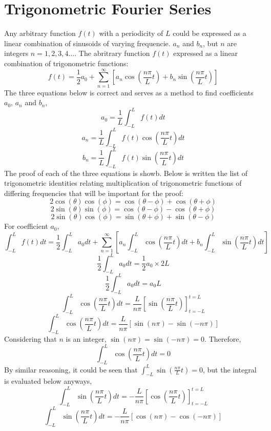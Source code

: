 \section{Trigonometric Fourier Series}
\begin{comment}
\end{comment}
Any arbitrary function $f(t)$ with a periodicity of $L$ could be expressed as a linear combination of sinusoids of varying frequencie. $a_n$ and $b_n$, but $n$ are integers $n = 1,2,3,4\dots$. The abritrary function $f(t)$ expressed as a linear combination of trigonometric functions:
$$f(t) = \frac{1}{2}a_0 + \sum_{n = 1}^{\infty}\left[a_n \cos\left(\frac{n\pi}{L}t\right) + b_n \sin\left(\frac{n\pi}{L}t\right)\right]$$
The three equations below is correct and serves as a method to find coefficients $a_0$, $a_n$ and $b_n$,
$$a_0 = \frac{1}{L}\int_{-L}^{L}f(t)dt$$
$$a_n = \frac{1}{L}\int_{-L}^{L}f(t)\cos\left(\frac{n\pi}{L}t\right)dt$$
$$b_n = \frac{1}{L}\int_{-L}^{L}f(t)\sin\left(\frac{n\pi}{L}t\right)dt$$
The proof of each of the three equations is showb. Below is written the list of trigonometric identities relating multiplication of trigonometric functions of differing frequencies that will be important for the proof:
$$2\cos(\theta)\cos(\phi) = \cos(\theta - \phi) + \cos(\theta + \phi)$$ 
$$2\sin(\theta)\sin(\phi) = \cos(\theta - \phi) - \cos(\theta + \phi)$$
$$2\sin(\theta)\cos(\phi) = \sin(\theta + \phi) + \sin(\theta - \phi)$$
For coefficient $a_0$,
$$\int_{-L}^{L}f(t)dt = \frac{1}{2} \int_{-L}^{L}a_0dt + \sum_{n = 1}^{\infty}\left[a_n \int_{-L}^{L}\cos\left(\frac{n\pi}{L}t\right)dt + b_n \int_{-L}^{L}\sin\left(\frac{n\pi}{L}t\right)dt\right]$$
$$\frac{1}{2} \int_{-L}^{L}a_0dt = \frac{1}{2}a_0\times2L$$
$$\frac{1}{2} \int_{-L}^{L}a_0dt = a_0L$$
$$\int_{-L}^{L}\cos\left(\frac{n\pi}{L}t\right)dt = \frac{L}{n\pi}\left[\sin\left(\frac{n\pi}{L}t\right)\right]^{t = L}_{t = -L}$$
$$\int_{-L}^{L}\cos\left(\frac{n\pi}{L}t\right)dt = \frac{L}{n\pi}\left[\sin\left(n\pi\right) - \sin\left(-n\pi\right)\right]$$
Considering that $n$ is an integer, $\sin\left(n\pi\right) = \sin\left(-n\pi\right) = 0$. Therefore, 
$$\int_{-L}^{L}\cos\left(\frac{n\pi}{L}t\right)dt = 0$$
By similar reasoning, it could be seen that $\displaystyle{\int_{-L}^{L}\sin\left(\frac{n\pi}{L}t\right) = 0}$, but the integral is evaluated below anyways,
$$\int_{-L}^{L}\sin\left(\frac{n\pi}{L}t\right)dt = -\frac{L}{n\pi}\left[\cos\left(\frac{n\pi}{L}t\right)\right]^{t = L}_{t = -L}$$
$$\int_{-L}^{L}\sin\left(\frac{n\pi}{L}t\right)dt = -\frac{L}{n\pi}\left[\cos\left(n\pi\right) - \cos\left(-n\pi\right)\right]$$
